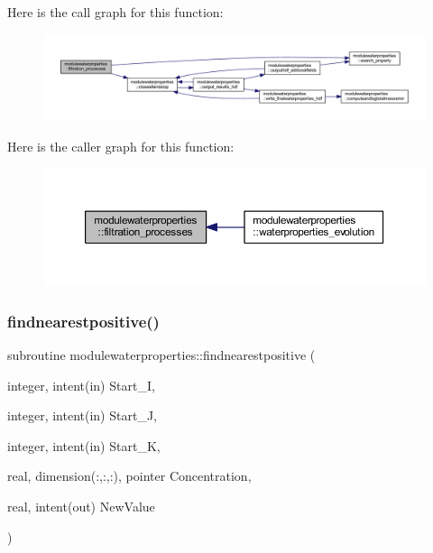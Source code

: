 Here is the call graph for this function\+:\nopagebreak
\begin{figure}[H]
\begin{center}
\leavevmode
\includegraphics[width=350pt]{namespacemodulewaterproperties_a58f066775e7df388495e6602c2d567e6_cgraph}
\end{center}
\end{figure}
Here is the caller graph for this function\+:\nopagebreak
\begin{figure}[H]
\begin{center}
\leavevmode
\includegraphics[width=350pt]{namespacemodulewaterproperties_a58f066775e7df388495e6602c2d567e6_icgraph}
\end{center}
\end{figure}
\mbox{\label{namespacemodulewaterproperties_a9af27763ee733163a23f71ee92aafb09}} 
\subsubsection{\texorpdfstring{findnearestpositive()}{findnearestpositive()}}
{\footnotesize\ttfamily subroutine modulewaterproperties\+::findnearestpositive (\begin{DoxyParamCaption}\item[{integer, intent(in)}]{Start\+\_\+I,  }\item[{integer, intent(in)}]{Start\+\_\+J,  }\item[{integer, intent(in)}]{Start\+\_\+K,  }\item[{real, dimension(\+:,\+:,\+:), pointer}]{Concentration,  }\item[{real, intent(out)}]{New\+Value }\end{DoxyParamCaption})\hspace{0.3cm}{\ttfamily [private]}}


